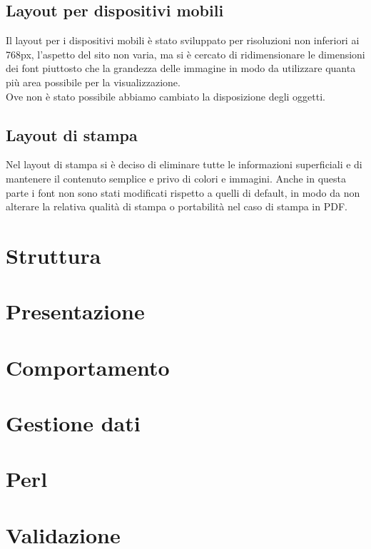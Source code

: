 \documentclass[11pt]{article}
\begin{document}
\subsection{Layout per dispositivi mobili}
Il layout per i dispositivi mobili è stato sviluppato per risoluzioni non inferiori ai 768px, l'aspetto del sito non varia, ma si è cercato di ridimensionare le dimensioni dei font piuttosto che la grandezza delle immagine in modo da utilizzare quanta più area possibile per la visualizzazione.
\\Ove non è stato possibile abbiamo cambiato la disposizione degli oggetti.

\subsection{Layout di stampa}
Nel layout di stampa si è deciso di eliminare tutte le informazioni superficiali e di mantenere il contenuto semplice e privo di colori e immagini. Anche in questa parte i font non sono stati modificati rispetto a quelli di default, in modo da non alterare la relativa qualità di stampa o portabilità nel caso di stampa in PDF.
\newpage
\section{Struttura}
\newpage

\section{Presentazione}
\newpage
\section{Comportamento}
\newpage
\section{Gestione dati}
\newpage
\section{Perl}
\newpage
\section{Validazione}
\end{document}
